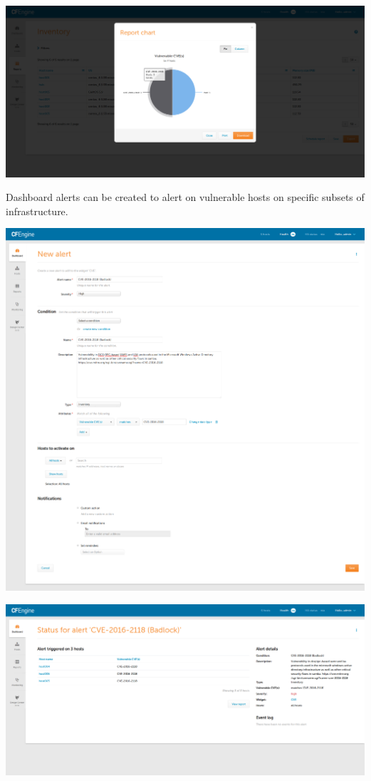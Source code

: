 \documentclass[11pt]{article}
\begin{document}
\includegraphics[width=.9\linewidth]{../media/inventory_report_vulnerable_cves_chart.png}

Dashboard alerts can be created to alert on vulnerable hosts on specific subsets
of infrastructure.

\includegraphics[width=.9\linewidth]{../media/define_alert.png}

\includegraphics[width=.9\linewidth]{../media/alert_status_vulnerable_hosts.png}
\end{document}

